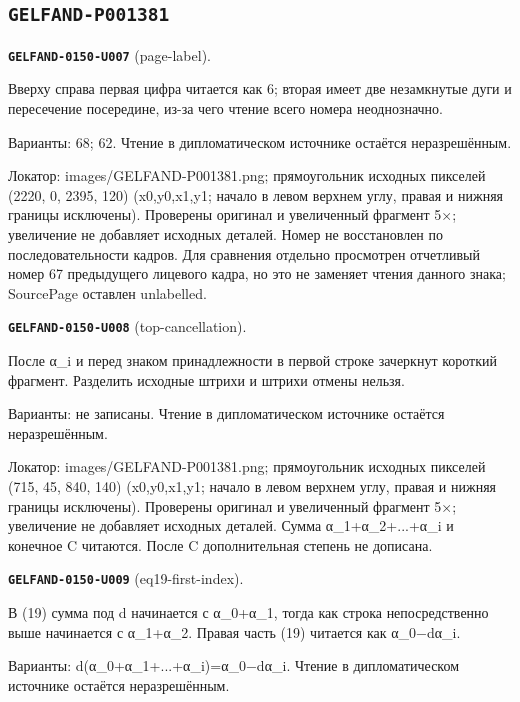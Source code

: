 \documentclass[11pt]{article}
\theoremstyle{definition}
\theoremstyle{remark}
\begin{document}
\subsection*{\texttt{GELFAND-P001381}}
\noindent\leavevmode{}\label{GELFAND-P001381:page-label:note}\textbf{\texttt{GELFAND-0150-U007}} (page-label).\par\nopagebreak[4]
Вверху справа первая цифра читается как 6; вторая имеет две незамкнутые дуги и пересечение посередине, из-за чего чтение всего номера неоднозначно.\par
Варианты: 68; 62. Чтение в дипломатическом источнике остаётся неразрешённым.\par
Локатор: images/GELFAND-P001381.png; прямоугольник исходных пикселей (2220, 0, 2395, 120) (x0,y0,x1,y1; начало в левом верхнем углу, правая и нижняя границы исключены). Проверены оригинал и увеличенный фрагмент 5×; увеличение не добавляет исходных деталей. Номер не восстановлен по последовательности кадров. Для сравнения отдельно просмотрен отчетливый номер 67 предыдущего лицевого кадра, но это не заменяет чтения данного знака; SourcePage оставлен unlabelled.\par\medskip
\noindent\leavevmode{}\label{GELFAND-P001381:top-cancellation:note}\textbf{\texttt{GELFAND-0150-U008}} (top-cancellation).\par\nopagebreak[4]
После α\_i и перед знаком принадлежности в первой строке зачеркнут короткий фрагмент. Разделить исходные штрихи и штрихи отмены нельзя.\par
Варианты: не записаны. Чтение в дипломатическом источнике остаётся неразрешённым.\par
Локатор: images/GELFAND-P001381.png; прямоугольник исходных пикселей (715, 45, 840, 140) (x0,y0,x1,y1; начало в левом верхнем углу, правая и нижняя границы исключены). Проверены оригинал и увеличенный фрагмент 5×; увеличение не добавляет исходных деталей. Сумма α\_1+α\_2+...+α\_i и конечное C читаются. После C дополнительная степень не дописана.\par\medskip
\noindent\leavevmode{}\label{GELFAND-P001381:eq19-first-index:note}\textbf{\texttt{GELFAND-0150-U009}} (eq19-first-index).\par\nopagebreak[4]
В (19) сумма под d начинается с α\_0+α\_1, тогда как строка непосредственно выше начинается с α\_1+α\_2. Правая часть (19) читается как α\_0−dα\_i.\par
Варианты: d(α\_0+α\_1+...+α\_i)=α\_0−dα\_i. Чтение в дипломатическом источнике остаётся неразрешённым.\par
\end{document}
